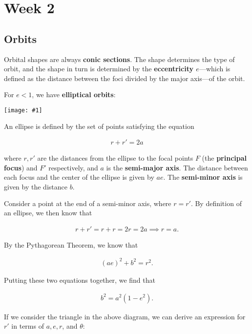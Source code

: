 \documentclass[a4paper,10pt]{article}
\newcommand{\fig}[1]{\centerline{\texttt{[image: \#1]}}}
\begin{document}

\newpage
\section{Week 2}

\subsection{Orbits}

Orbital shapes are always \textbf{conic sections}. The shape determines the type of orbit, and the shape in turn is determined by the \textbf{eccentricity $e$}—which is defined as the distance between the foci divided by the major axis—of the orbit. 

For $e<1$, we have \textbf{elliptical orbits}:

\fig{ellipse}

An ellipse is defined by the set of points satisfying the equation

\begin{align*}
    r + r' = 2a
\end{align*}

where $r, r'$ are the distances from the ellipse to the focal points $F$ (the \textbf{principal focus}) and $F'$ respectively, and $a$ is the \textbf{semi-major axis}. The distance between each focus and the center of the ellipse is given by $ae$. The \textbf{semi-minor axis} is given by the distance $b$. 

Consider a point at the end of a semi-minor axis, where $r=r'$. By definition of an ellipse, we then know that 

\begin{align*}
    r+r'=r+r=2r=2a
    \implies r=a.
\end{align*}

By the Pythagorean Theorem, we know that 

\begin{align*}
    (ae)^2 + b^2 = r^2.
\end{align*}

Putting these two equations together, we find that 

\begin{align*}
    b^2 = a^2(1-e^2).
\end{align*}

If we consider the triangle in the above diagram, we can derive an expression for $r'$ in terms of $a, e, r$, and $\theta$:
\end{document}
